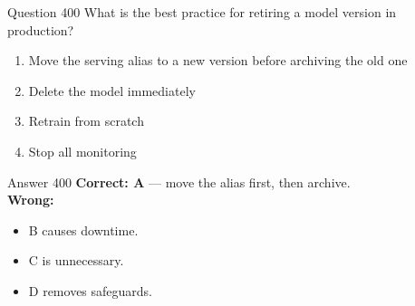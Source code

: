 \documentclass[aspectratio=169,11pt]{beamer}
\begin{document}
	\begin{frame}{Question 400}
		What is the best practice for retiring a model version in production?
		\begin{enumerate}[label=\Alph*.]
			\item Move the serving alias to a new version before archiving the old one
			\item Delete the model immediately
			\item Retrain from scratch
			\item Stop all monitoring
		\end{enumerate}
	\end{frame}
	\begin{frame}{Answer 400}
		\textbf{Correct: A} --- move the alias first, then archive.\\
		\vspace{0.5em}
		\textbf{Wrong:}
		\begin{itemize}
			\item B causes downtime.
			\item C is unnecessary.
			\item D removes safeguards.
		\end{itemize}
	\end{frame}
	
\end{document}
